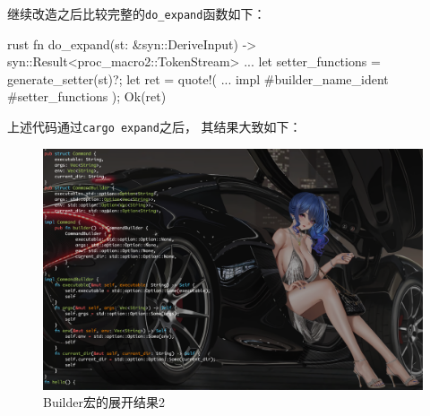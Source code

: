 继续改造之后比较完整的\texttt{do_expand}函数如下：
\begin{code-block}{rust}
fn do_expand(st: &syn::DeriveInput) -> syn::Result<proc_macro2::TokenStream> {
    ...
    let setter_functions = generate_setter(st)?;
    let ret = quote!(
        ...
        impl #builder_name_ident {
            #setter_functions
        }
    );
    Ok(ret)
}
\end{code-block}
上述代码通过\texttt{cargo expand}之后，
其结果大致如下：
\begin{figure}[H]
  \centering
  \includegraphics[width=\linewidth]{rust_expand_2.png}
  \caption{Builder宏的展开结果2}
  \label{fig:rust_expand_2}
\end{figure}

